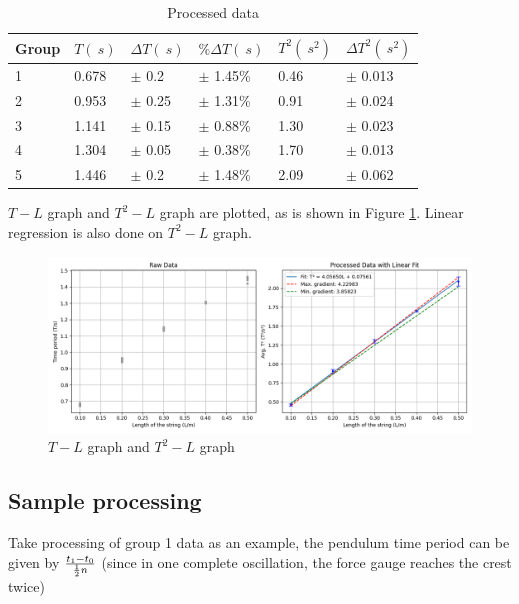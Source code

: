 \documentclass[a4paper]{article}
\newcommand{\grayrow}{\rowcolor[gray]{0.925}}
\begin{document}
\begin{table}[!ht]
    \centering
    \caption{Processed data}
    \label{tab.proc}
    \vspace{0.2cm}
    \begin{tabularx}{0.9\textwidth}{XXXXXX}
    \hline
        Group & $T(\SI{}{s})$ & $\Delta T(\SI{}{s})$ & $\%\Delta T(\SI{}{s})$ & $T^2(\SI{}{s^2})$ & $\Delta T^2(\SI{}{s^2})$   \\ \hline
        \grayrow 1 & 0.678  & $\pm$ 0.2 & $\pm$ 1.45\% & 0.46  & $\pm$ 0.013   \\ %
        2 & 0.953  & $\pm$ 0.25 & $\pm$ 1.31\% & 0.91  & $\pm$ 0.024   \\ %
        \grayrow 3 & 1.141  & $\pm$ 0.15 & $\pm$ 0.88\% & 1.30  & $\pm$ 0.023   \\ %
        4 & 1.304  & $\pm$ 0.05 & $\pm$ 0.38\% & 1.70  & $\pm$ 0.013   \\ %
        \grayrow 5 & 1.446  & $\pm$ 0.2 & $\pm$ 1.48\% & 2.09  & $\pm$ 0.062   \\ \hline
    \end{tabularx}
\end{table}

$T-L$ graph and $T^2-L$ graph are plotted, as is shown in Figure \ref{fig.proc}. Linear regression is also done on $T^2-L$ graph. 

\begin{figure}[ht]
    \centering
    \includegraphics[width = \textwidth]{figure/Figure_1.png}
    \caption{$T-L$ graph and $T^2 - L$ graph}
    \label{fig.proc}
\end{figure}

\subsection{Sample processing}

Take processing of group 1 data as an example, the pendulum time period can be given by $t_1-t_0\over \frac{1}{2} n$ (since in one complete oscillation, the force gauge reaches the crest twice)
\end{document}
